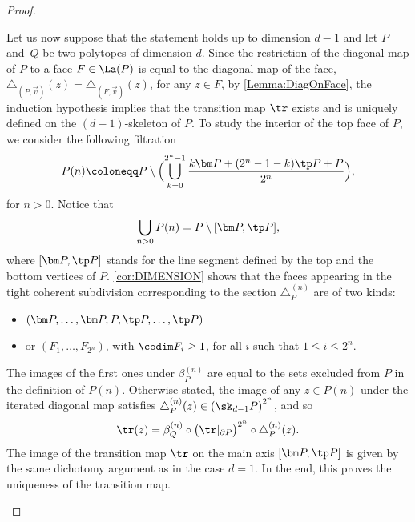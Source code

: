 \begin{proof}
\begin{enumerate}
Let us now suppose that the statement holds up to dimension $d-1$ and let $P$ and~$Q$ be two polytopes of dimension $d$. Since the restriction of the diagonal map of $P$ to a face $F\in \La(P)$ is equal to the diagonal map of the face, \ie $\triangle_{(P, \vec v)}(z)=\triangle_{(F, \vec v)}(z)$, for any $z\in F$, by \cref{Lemma:DiagOnFace}, the
induction hypothesis implies that the transition map $\tr$ exists and is uniquely defined on the $(d-1)$-skeleton of $P$.
To study the interior of the top face of $P$, we consider the following filtration
\[P(n)\coloneqq P\setminus \Bigl(\bigcup_{k=0}^{2^n-1} \frac{k\bm P+(2^n-1-k)\tp P + P}{2^n} \Bigr),\]
for $n> 0$. Notice that
\[\bigcup_{n>0} P(n)=P \setminus [\bm P, \tp P],\]
where $[\bm P, \tp P]$ stands for the line segment defined by the top and the bottom vertices of $P$.
\cref{cor:DIMENSION} shows that the faces appearing in the tight coherent subdivision
corresponding to the section
$\triangle^{(n)}_P$ are of two kinds:
\begin{itemize}
\item
$(\bm P, \ldots, \bm P, P, \tp P, \ldots, \tp P)$
\item
or $(F_1, \ldots, F_{2^n})$, with
$\codim F_i\geq 1$, for all $i$ such that $1\leq i \leq 2^n$. 
\end{itemize}
The images of the first ones under $\beta^{(n)}_P$ are equal to the sets excluded from $P$ in the definition of $P(n)$. Otherwise stated, the image of any $z\in P(n)$ under the iterated diagonal map satisfies $\triangle^{(n)}_P(z)\in \left(\sk_{d-1}P\right)^{2^n}$, and so
\[\tr(z) = \beta^{(n)}_Q\circ\big(\tr|_{\partial P}\big)^{2^n}\circ\triangle^{(n)}_P(z). \]
The image of the transition map $\tr$ on the main axis $[\bm P, \tp P]$ is given by the same dichotomy argument as in the case $d=1$. In the end, this proves the uniqueness of the transition map.


\end{enumerate}
\end{proof}
